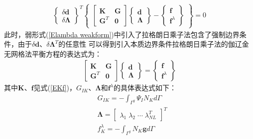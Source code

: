 \begin{equation}
\begin{split}
  \left\{\begin{matrix}\delta\pmb{d}\\\delta\pmb{\Lambda}\end{matrix}\right\}^T
  \left\{\begin{matrix}
  \left[\begin{matrix}\pmb{K}&\pmb{G}\\\pmb{G}^T&\pmb{0}\end{matrix}\right]
  \left\{\begin{matrix}\pmb{d}\\\pmb{\Lambda}\end{matrix}\right\}-
  \left\{\begin{matrix}\pmb{f}\\\pmb{f}^{\lambda}\end{matrix}\right\}
  \end{matrix}\right\}=0
\end{split}
\end{equation}
此时，弱形式(\ref{Elambda weakform})中引入了拉格朗日乘子法包含了强制边界条件，由于$\delta{\pmb{d}}$、$\delta\pmb{\Lambda}^T$的任意性
可以得到引入本质边界条件拉格朗日乘子法的伽辽金无网格法平衡方程的表达式为：
\begin{equation}
\begin{split}
    \left[\begin{matrix}\pmb{K}&\pmb{G}\\\pmb{G}^T&\pmb{0}\end{matrix}\right]
    \left\{\begin{matrix}\pmb{d}\\\pmb{\Lambda}\end{matrix}\right\}=
    \left\{\begin{matrix}\pmb{f}\\\pmb{f}^{\lambda}\end{matrix}\right\}
\end{split}
\end{equation}
其中$\pmb{K}$、$\pmb{f}$见式(\ref{EKf})，$G_{IK}$、$\pmb{\Lambda}$和$\pmb{f}^{\lambda}$的具体表达式如下：
\begin{equation}
\begin{split}
    &G_{IK}=-\int_{\Gamma^g}\Psi_IN_Kd\Gamma\\
    &\pmb{\Lambda}= \left[\begin{matrix}\lambda_1\;\lambda_2\;\dotsb\;\lambda_{NL}^T\end{matrix}\right]^T\\
    &f_K^{\lambda}=-\int_{\Gamma^g}N_K\pmb{g}d\Gamma
\end{split}
\end{equation}\par
